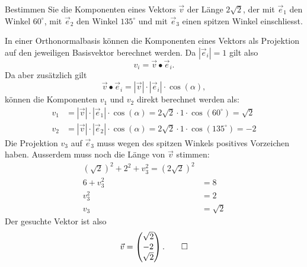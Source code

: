 Bestimmen Sie die Komponenten eines Vektors $\vec v$ der Länge $2\sqrt{2}$,
der mit $\vec e_1$ den Winkel $60^\circ$, mit $\vec e_2$ den Winkel
$135^\circ$ und mit $\vec e_3$ einen spitzen Winkel einschliesst.


\begin{loesung}
In einer Orthonormalbasis können die Komponenten eines Vektors als Projektion
auf den jeweiligen Basisvektor berechnet werden. Da $|\vec e_i| = 1$ gilt also
\[
  v_i = \vec v \bullet \vec e_i.
\]
Da aber zusätzlich gilt
\[
  \vec v \bullet \vec e_i = |\vec v|\cdot |\vec e_i| \cdot \cos(\alpha),
\]
können die Komponenten $v_1$ und $v_2$ direkt berechnet werden als:
\begin{align*}
  v_1 & = |\vec v|\cdot |\vec e_1| \cdot \cos(\alpha) = 2\sqrt{2}\cdot 1 \cdot \cos (60^\circ)=\sqrt{2}\\
  v_2 & = |\vec v|\cdot |\vec e_2| \cdot \cos(\alpha) = 2\sqrt{2}\cdot 1 \cdot \cos (135^\circ)=-2
\end{align*}
Die Projektion $v_3$ auf $\vec e_3$ muss wegen des spitzen Winkels positives Vorzeichen haben.
Ausserdem muss noch die Länge von $\vec v$ stimmen:
\begin{align*}
(\sqrt{2})^2+2^2+v_3^2=(2\sqrt{2})^2\\
6+v_3^2&=8\\
v_3^2&=2\\
v_3&=\sqrt {2}
\end{align*}
Der gesuchte Vektor ist also
\[
\vec v = \begin{pmatrix}\sqrt{2}\\-2\\\sqrt{2}\end{pmatrix}.
\qedhere
\]
\end{loesung}

